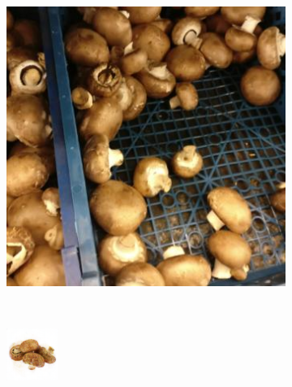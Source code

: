 \begin{figure}[t]
\begin{subfigure}[b]{0.18\textwidth}
		\caption{}
		\label{subfig:royal-gala-decoded}
	\end{subfigure} ~~~
	\begin{subfigure}[b]{0.18\textwidth}
		\centering
		\includegraphics[width=\textwidth]{PaperA/decoded-image-figure/Mushroom-Brown-Cap_027.jpg}
		\caption{}
		\label{subfig:brown-cap-natural}
	\end{subfigure} ~
	\begin{subfigure}[b]{0.18\textwidth}
		\centering
		\includegraphics[width=\textwidth]{PaperA/decoded-image-figure/densenet_nov11/Mushroom-Brown-Cap_decoded.png}

\end{subfigure}
\end{figure}
